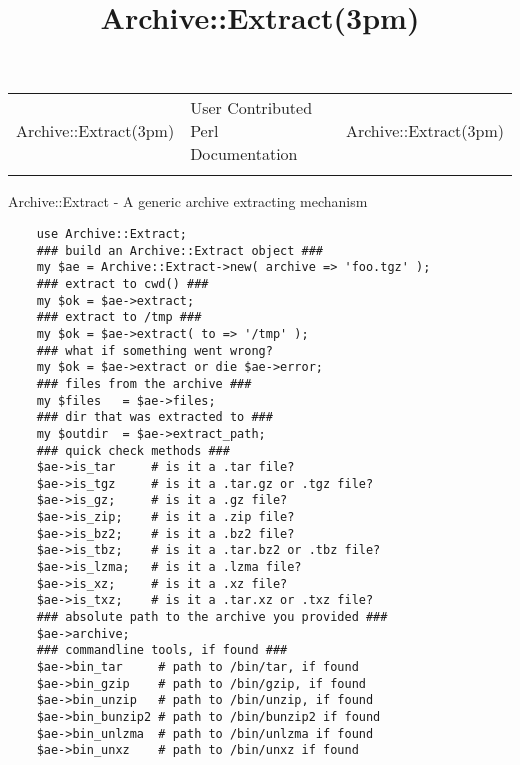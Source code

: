 \documentclass[]{article}
\title{Archive::Extract(3pm)}
\author{}
\date{}
\begin{document}
\maketitle

\begin{longtable}[c]{@{}lll@{}}
\toprule\addlinespace
Archive::Extract(3pm) & User Contributed Perl Documentation &
Archive::Extract(3pm)
\\\addlinespace
\bottomrule
\end{longtable}


Archive::Extract - A generic archive extracting mechanism


\begin{verbatim}
    use Archive::Extract;
    ### build an Archive::Extract object ###
    my $ae = Archive::Extract->new( archive => 'foo.tgz' );
    ### extract to cwd() ###
    my $ok = $ae->extract;
    ### extract to /tmp ###
    my $ok = $ae->extract( to => '/tmp' );
    ### what if something went wrong?
    my $ok = $ae->extract or die $ae->error;
    ### files from the archive ###
    my $files   = $ae->files;
    ### dir that was extracted to ###
    my $outdir  = $ae->extract_path;
    ### quick check methods ###
    $ae->is_tar     # is it a .tar file?
    $ae->is_tgz     # is it a .tar.gz or .tgz file?
    $ae->is_gz;     # is it a .gz file?
    $ae->is_zip;    # is it a .zip file?
    $ae->is_bz2;    # is it a .bz2 file?
    $ae->is_tbz;    # is it a .tar.bz2 or .tbz file?
    $ae->is_lzma;   # is it a .lzma file?
    $ae->is_xz;     # is it a .xz file?
    $ae->is_txz;    # is it a .tar.xz or .txz file?
    ### absolute path to the archive you provided ###
    $ae->archive;
    ### commandline tools, if found ###
    $ae->bin_tar     # path to /bin/tar, if found
    $ae->bin_gzip    # path to /bin/gzip, if found
    $ae->bin_unzip   # path to /bin/unzip, if found
    $ae->bin_bunzip2 # path to /bin/bunzip2 if found
    $ae->bin_unlzma  # path to /bin/unlzma if found
    $ae->bin_unxz    # path to /bin/unxz if found
\end{verbatim}
\end{document}
